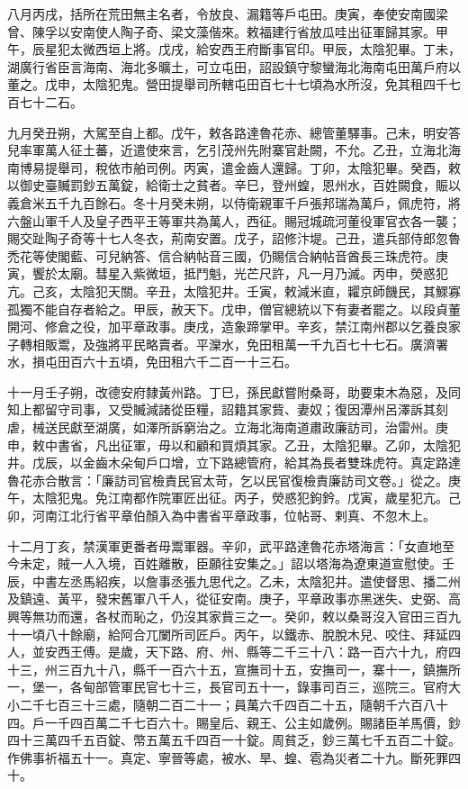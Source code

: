 \begin{pinyinscope}
 八月丙戌，括所在荒田無主名者，令放良、漏籍等戶屯田。庚寅，奉使安南國梁曾、陳孚以安南使人陶子奇、梁文藻偕來。敕福建行省放瓜哇出征軍歸其家。甲午，辰星犯太微西垣上將。戊戌，給安西王府斷事官印。甲辰，太陰犯畢。丁未，湖廣行省臣言海南、海北多曠土，可立屯田，詔設鎮守黎蠻海北海南屯田萬戶府以董之。戊申，太陰犯鬼。營田提舉司所轄屯田百七十七頃為水所沒，免其租四千七百七十二石。



 九月癸丑朔，大駕至自上都。戊午，敕各路達魯花赤、總管董驛事。己未，明安答兒率軍萬人征土蕃，近遣使來言，乞引茂州先附寨官赴闕，不允。乙丑，立海北海南博易提舉司，稅依市舶司例。丙寅，遣金齒人還歸。丁卯，太陰犯畢。癸酉，敕以御史臺贓罰鈔五萬錠，給衛士之貧者。辛巳，登州蝗，恩州水，百姓闕食，賑以義倉米五千九百餘石。冬十月癸未朔，以侍衛親軍千戶張邦瑞為萬戶，佩虎符，將六盤山軍千人及皇子西平王等軍共為萬人，西征。賜冠城疏河董役軍官衣各一襲；賜交趾陶子奇等十七人冬衣，荊南安置。戊子，詔修汴堤。己丑，遣兵部侍郎忽魯禿花等使閣藍、可兒納答、信合納帖音三國，仍賜信合納帖音酋長三珠虎符。庚寅，饗於太廟。彗星入紫微垣，抵鬥魁，光芒尺許，凡一月乃滅。丙申，熒惑犯亢。己亥，太陰犯天關。辛丑，太陰犯井。壬寅，敕減米直，糶京師饑民，其鰥寡孤獨不能自存者給之。甲辰，赦天下。戊申，僧官總統以下有妻者罷之。以段貞董開河、修倉之役，加平章政事。庚戌，造象蹄掌甲。辛亥，禁江南州郡以乞養良家子轉相販鬻，及強將平民略賣者。平灤水，免田租萬一千九百七十七石。廣濟署水，損屯田百六十五頃，免田租六千二百一十三石。



 十一月壬子朔，改德安府隸黃州路。丁巳，孫民獻嘗附桑哥，助要束木為惡，及同知上都留守司事，又受贓減諸從臣糧，詔籍其家貲、妻奴；復因潭州呂澤訴其刻虐，械送民獻至湖廣，如澤所訴窮治之。立海北海南道肅政廉訪司，治雷州。庚申，敕中書省，凡出征軍，毋以和顧和買煩其家。乙丑，太陰犯畢。乙卯，太陰犯井。戊辰，以金齒木朵甸戶口增，立下路總管府，給其為長者雙珠虎符。真定路達魯花赤合散言：「廉訪司官檢責民官太苛，乞以民官復檢責廉訪司文卷。」從之。庚午，太陰犯鬼。免江南都作院軍匠出征。丙子，熒惑犯鉤鈐。戊寅，歲星犯亢。己卯，河南江北行省平章伯顏入為中書省平章政事，位帖哥、剌真、不忽木上。



 十二月丁亥，禁漢軍更番者毋鬻軍器。辛卯，武平路達魯花赤塔海言：「女直地至今未定，賊一人入境，百姓離散，臣願往安集之。」詔以塔海為遼東道宣慰使。壬辰，中書左丞馬紹疾，以詹事丞張九思代之。乙未，太陰犯井。遣使督思、播二州及鎮遠、黃平，發宋舊軍八千人，從征安南。庚子，平章政事亦黑迷失、史弼、高興等無功而還，各杖而恥之，仍沒其家貲三之一。癸卯，敕以桑哥沒入官田三百九十一頃八十餘廟，給阿合兀闌所司匠戶。丙午，以鐵赤、脫脫木兒、咬住、拜延四人，並安西王傅。是歲，天下路、府、州、縣等二千三十八：路一百六十九，府四十三，州三百九十八，縣千一百六十五，宣撫司十五，安撫司一，寨十一，鎮撫所一，堡一，各甸部管軍民官七十三，長官司五十一，錄事司百三，巡院三。官府大小二千七百三十三處，隨朝二百二十一；員萬六千四百二十五，隨朝千六百八十四。戶一千四百萬二千七百六十。賜皇后、親王、公主如歲例。賜諸臣羊馬價，鈔四十三萬四千五百錠、幣五萬五千四百一十錠。周貧乏，鈔三萬七千五百二十錠。作佛事祈福五十一。真定、寧晉等處，被水、旱、蝗、雹為災者二十九。斷死罪四十。




\end{pinyinscope}
